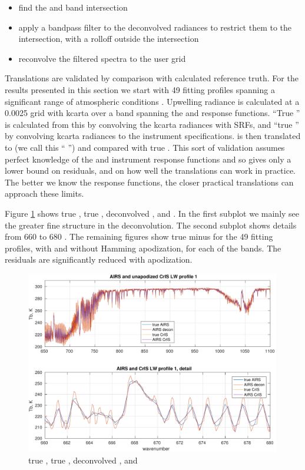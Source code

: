 \documentclass[12pt]{article}
\begin{document}
\begin{itemize}
  \item find the {\airs} and {\cris} band intersection

  \item apply a bandpass filter to the deconvolved {\airs} radiances
    to restrict them to the intersection, with a rolloff outside the
    intersection

  \item reconvolve the filtered spectra to the {\cris} user grid

\end{itemize}

Translations are validated by comparison with calculated reference
truth.  For the results presented in this section we start with 49
fitting profiles spanning a significant range of atmospheric
conditions \cite{sarta1,sarta2}.  Upwelling radiance is calculated at
a 0.0025 {\wn} grid with kcarta \cite{kcarta1} over a band spanning
the {\airs} and {\cris} response functions.  ``True {\airs}'' is
calculated from this by convolving the kcarta radiances with {\airs}
SRFs, and ``true {\cris}'' by convolving kcarta radiances to the
{\cris} instrument specifications.  {\airs} is then translated to
{\cris} (we call this ``{\airs} {\cris}'') and compared with true
{\cris}.  This sort of validation assumes perfect knowledge of the
{\airs} and {\cris} instrument response functions and so gives only a
lower bound on residuals, and on how well the translations can work
in practice.  The better we know the response functions, the closer
practical translations can approach these limits.

Figure \ref{aclws} shows true {\cris}, true {\airs}, deconvolved
{\airs}, and {\airs} {\cris}.  In the first subplot we mainly see the
greater fine structure in the deconvolution.  The second subplot
shows details from 660 to 680 {\wn}.  The remaining figures show true
{\cris} minus {\airs} {\cris} for the 49 fitting profiles, with and
without Hamming apodization, for each of the {\cris} bands.  The
residuals are significantly reduced with apodization.

\begin{figure} %
  \centering
  \includegraphics[height=8cm]{figures/a2cris_spec_LW.pdf}
  \caption{true {\cris}, true {\airs}, deconvolved {\airs}, and
    {\airs} {\cris}}
  \label{aclws}
\end{figure}
\end{document}
